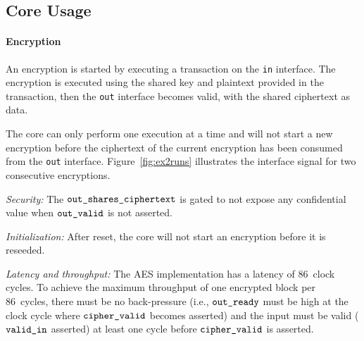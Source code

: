 \documentclass{scrartcl}
\begin{document}
\subsection{Core Usage}

\paragraph{Encryption}
An encryption is started by executing a transaction on the \texttt{in} interface.
The encryption is executed using the shared key and plaintext provided in the
transaction, then the \texttt{out} interface becomes valid, with the shared
ciphertext as data.

The core can only perform one execution at a time and will not start a new
encryption before the ciphertext of the current encryption has been consumed from
the \texttt{out} interface.
Figure~\ref{fig:ex2runs} illustrates the interface signal for two consecutive encryptions.

\emph{Security:}
The $\texttt{out\_shares\_ciphertext}$ is gated to not expose any confidential value when
$\texttt{out\_valid}$ is not asserted.

\emph{Initialization:}
After reset, the core will not start an encryption before it is reseeded.

\emph{Latency and throughput:}
The AES implementation has a latency of 86~clock cycles. To achieve the
maximum throughput of one encrypted block per 86~cycles, there must be no
back-pressure (i.e., $\texttt{out\_ready}$ must be high at the clock cycle where
$\texttt{cipher\_valid}$ becomes asserted) and the input must be valid
($\texttt{valid\_in}$ asserted) at least one cycle before $\texttt{cipher\_valid}$ is
asserted.
\end{document}
